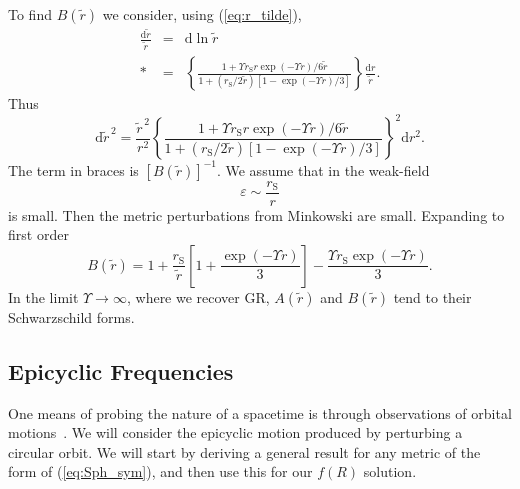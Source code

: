 \documentclass[aps,prd,amsfonts,amssymb,amsmath,nofootinbib,reprint,showpacs]{revtex4-1}
\newcommand{\eqnref}[1]{(\ref{eq:#1})}
\newcommand{\sub}[1]{\ensuremath{_\text{#1}}}
\newcommand{\dd}{\ensuremath{\text{d}}}
\begin{document}
To find $B(\widetilde{r})$ we consider, using \eqnref{r_tilde},
\begin{eqnarray}
\frac{\dd \widetilde{r}}{\widetilde{r}} & = & \dd \ln \widetilde{r} \nonumber \\*
 & = & \left\{\frac{1 + {\Upsilon r\sub{S}r\exp(-\Upsilon r)}/{6\widetilde{r}}}{1 + ({r\sub{S}}/{2\widetilde{r}})\left[1 - {\exp(-\Upsilon r)}/{3}\right]}\right\}\frac{\dd r}{\widetilde{r}}.
\end{eqnarray}
Thus
\begin{equation}
\dd \widetilde{r}^{\,2} = \frac{\widetilde{r}^{\,2}}{r^2}\left\{\frac{1 + {\Upsilon r\sub{S}r\exp(-\Upsilon r)}/{6\widetilde{r}}}{1 + ({r\sub{S}}/{2\widetilde{r}})\left[1 - {\exp(-\Upsilon r)}/{3}\right]}\right\}^2 \dd r^2.
\end{equation}
The term in braces is $\left[B(\widetilde{r})\right]^{-1}$. We assume that in the weak-field
\begin{equation}
\varepsilon \sim \frac{r\sub{S}}{r}
\end{equation}
is small. Then the metric perturbations from Minkowski are small. Expanding to first order~\cite{Olmo2007c}
\begin{equation}
B(\widetilde{r})  = 1 + \frac{r\sub{S}}{\widetilde{r}}\left[1 + \frac{\exp(-\Upsilon r )}{3}\right] - \frac{\Upsilon r\sub{S} \exp(-\Upsilon r)}{3}.
\label{eq:B_metric}
\end{equation}
In the limit $\Upsilon \rightarrow \infty$, where we recover GR, $A(\widetilde{r})$ and $B(\widetilde{r})$ tend to their Schwarzschild forms.

\subsection{Epicyclic Frequencies\label{sec:Epicycle}}

One means of probing the nature of a spacetime is through observations of orbital motions~\cite{Gair2008a}. We will consider the epicyclic motion produced by perturbing a circular orbit. We will start by deriving a general result for any metric of the form of \eqnref{Sph_sym}, and then use this for our $f(R)$ solution.
\end{document}
